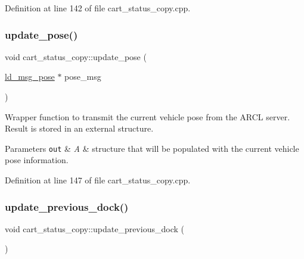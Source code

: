 Definition at line 142 of file cart\+\_\+status\+\_\+copy.\+cpp.

\mbox{\label{classcart__status__copy_ac688410b9b4a237d6ce6379e10f3c8bb}} 
\subsubsection{\texorpdfstring{update\+\_\+pose()}{update\_pose()}\hspace{0.1cm}{\footnotesize\ttfamily [2/2]}}
{\footnotesize\ttfamily void cart\+\_\+status\+\_\+copy\+::update\+\_\+pose (\begin{DoxyParamCaption}\item[{\mbox{\hyperlink{structld__msg__pose}{ld\+\_\+msg\+\_\+pose}} $\ast$}]{pose\+\_\+msg }\end{DoxyParamCaption})}

Wrapper function to transmit the current vehicle pose from the A\+R\+CL server. Result is stored in an external structure. 
\begin{DoxyParams}[1]{Parameters}
\mbox{\tt out}  & {\em A} & structure that will be populated with the current vehicle pose information. \\
\hline
\end{DoxyParams}


Definition at line 147 of file cart\+\_\+status\+\_\+copy.\+cpp.

\mbox{\label{classcart__status__copy_a49621a3d5ab294434c04b17668c2d613}} 
\subsubsection{\texorpdfstring{update\+\_\+previous\+\_\+dock()}{update\_previous\_dock()}}
{\footnotesize\ttfamily void cart\+\_\+status\+\_\+copy\+::update\+\_\+previous\+\_\+dock (\begin{DoxyParamCaption}{ }\end{DoxyParamCaption})}

